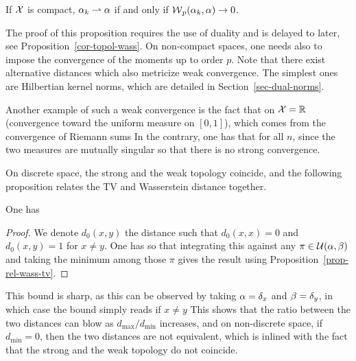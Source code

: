 \begin{prop}
	If $\mathcal{X}$ is compact, $\alpha_k \rightharpoonup \alpha$ if and only if $\operatorname{\mathcal{W}}_p(\alpha_k,\alpha) \rightarrow 0$. 
\end{prop}

The proof of this proposition requires the use of duality and is delayed to later, see Proposition~\ref{cor-topol-wass}. 
On non-compact spaces, one needs also to impose the convergence of the moments up to order $p$.
%
Note that there exist alternative distances which also metricize weak convergence. The simplest ones are Hilbertian kernel norms, which are detailed in Section~\ref{sec-dual-norms}.

Another example of such a weak convergence is the fact that on $\mathcal{X}=\mathbb{R}$
(convergence toward the uniform measure on $[0,1]$), which comes from the convergence of Riemann sums 
In the contrary, one has that for all $n$, since the two measures are mutually singular
so that there is no strong convergence.

On discrete space, the strong and the weak topology coincide, and the following proposition relates the TV and Wasserstein distance together. 

\begin{prop}
	One has
\end{prop}

\begin{proof}
	We denote $d_0(x,y)$ the distance such that $d_0(x,x)=0$ and $d_0(x,y)=1$ for $x \neq y$. One has 
	so that integrating this against any $\pi \in \mathcal{U}(\alpha,\beta)$ and taking the minimum among those $\pi$ gives the result using Proposition~\eqref{prop-rel-wass-tv}. 
\end{proof}

This bound is sharp, as this can be observed by taking $\alpha=\delta_{x}$ and $\beta=\delta_y$, in which case the bound simply reads if $x \neq y$
%
This shows that the ratio between the two distances can blow as $d_{\max}/d_{\min}$ increases, and on non-discrete space, if $d_{\min}=0$, then the two distances are not equivalent, which is inlined with the fact that the strong and the weak topology do not coincide. 



